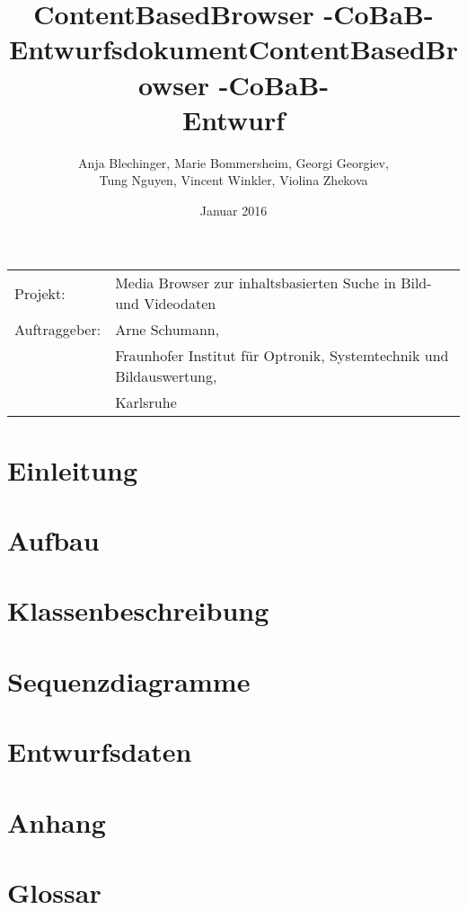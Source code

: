 \documentclass[parskip=full]{scrartcl}
\title{ContentBasedBrowser -CoBaB- \\ Entwurfsdokument}
\begin{document}
\begin{titlepage}
\title{ContentBasedBrowser -CoBaB- \\ Entwurf}
\author{Anja Blechinger, Marie Bommersheim, Georgi Georgiev,\\ Tung Nguyen, Vincent Winkler, Violina Zhekova}
\date{Januar 2016}
\maketitle
\vspace{300pt}
\begin{tabular}{l l}
Projekt: & Media Browser zur inhaltsbasierten Suche in Bild- und Videodaten\\
Auftraggeber: & Arne Schumann,\\
 & Fraunhofer Institut für Optronik, Systemtechnik und Bildauswertung,\\
 & Karlsruhe\\
\end{tabular}
\thispagestyle{empty}
\end{titlepage}
\setcounter{page}{1}

\tableofcontents
\pagebreak

\section{Einleitung}

\pagebreak

\section{Aufbau}

\pagebreak

\section{Klassenbeschreibung}

\pagebreak

\section{Sequenzdiagramme}

\pagebreak

\section{Entwurfsdaten}

\pagebreak

\section{Anhang}

\pagebreak

\section{Glossar}
\printglossaries
\end{document}
